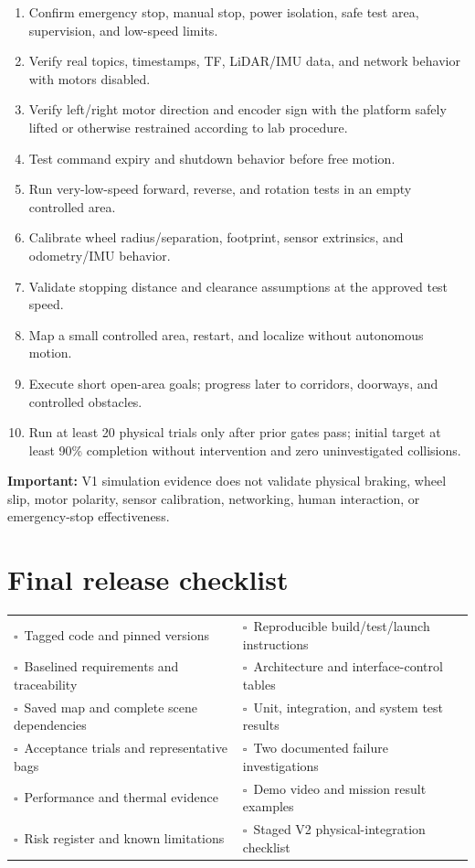 \documentclass[10pt,a4paper]{article}
\newcommand{\cb}{\(\square\)}
\begin{document}
\begin{enumerate}[leftmargin=8mm,itemsep=2pt]
  \item[\cb] Confirm emergency stop, manual stop, power isolation, safe test area, supervision, and low-speed limits.
  \item[\cb] Verify real topics, timestamps, TF, LiDAR/IMU data, and network behavior with motors disabled.
  \item[\cb] Verify left/right motor direction and encoder sign with the platform safely lifted or otherwise restrained according to lab procedure.
  \item[\cb] Test command expiry and shutdown behavior before free motion.
  \item[\cb] Run very-low-speed forward, reverse, and rotation tests in an empty controlled area.
  \item[\cb] Calibrate wheel radius/separation, footprint, sensor extrinsics, and odometry/IMU behavior.
  \item[\cb] Validate stopping distance and clearance assumptions at the approved test speed.
  \item[\cb] Map a small controlled area, restart, and localize without autonomous motion.
  \item[\cb] Execute short open-area goals; progress later to corridors, doorways, and controlled obstacles.
  \item[\cb] Run at least 20 physical trials only after prior gates pass; initial target at least 90\% completion without intervention and zero uninvestigated collisions.
\end{enumerate}

\textbf{Important:} V1 simulation evidence does not validate physical braking, wheel slip, motor polarity, sensor calibration, networking, human interaction, or emergency-stop effectiveness.

\newpage
\section{Final release checklist}

\begin{tabularx}{\textwidth}{X X}
\cb\ Tagged code and pinned versions & \cb\ Reproducible build/test/launch instructions \\
\cb\ Baselined requirements and traceability & \cb\ Architecture and interface-control tables \\
\cb\ Saved map and complete scene dependencies & \cb\ Unit, integration, and system test results \\
\cb\ Acceptance trials and representative bags & \cb\ Two documented failure investigations \\
\cb\ Performance and thermal evidence & \cb\ Demo video and mission result examples \\
\cb\ Risk register and known limitations & \cb\ Staged V2 physical-integration checklist \\
\end{tabularx}
\end{document}
